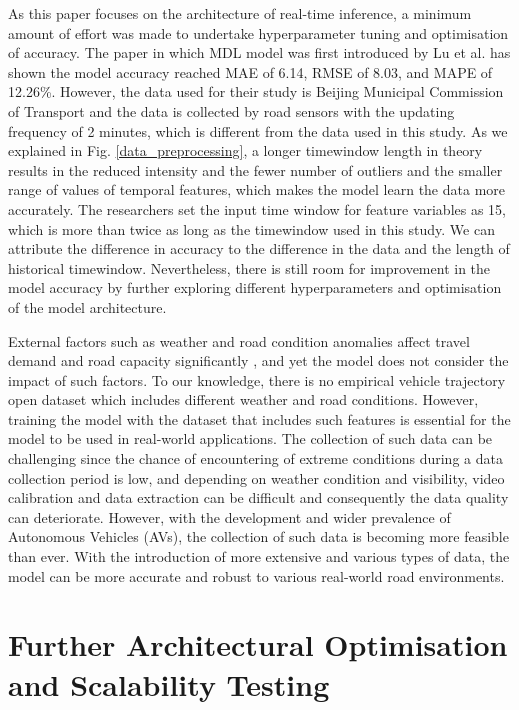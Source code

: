 \documentclass[11pt]{uonthesis}
\begin{document}
As this paper focuses on the architecture of real-time inference, a minimum amount of effort was made to undertake hyperparameter tuning and optimisation of accuracy. The paper in which MDL model was first introduced by Lu et al. \cite{9284587} has shown the model accuracy reached MAE of 6.14, RMSE of 8.03, and MAPE of 12.26\%. However, the data used for their study is Beijing Municipal Commission of Transport and the data is collected by road sensors with the updating frequency of 2 minutes, which is different from the data used in this study. As we explained in Fig. \ref{data_preprocessing}, a longer timewindow length in theory results in the reduced intensity and the fewer number of outliers and the smaller range of values of temporal features, which makes the model learn the data more accurately. The researchers set the input time window for feature variables as 15, which is more than twice as long as the timewindow used in this study. We can attribute the difference in accuracy to the difference in the data and the length of historical timewindow. Nevertheless, there is still room for improvement in the model accuracy by further exploring different hyperparameters and optimisation of the model architecture.

External factors such as weather and road condition anomalies affect travel demand and road capacity significantly \cite{WANG2023107044}, and yet the model does not consider the impact of such factors. To our knowledge, there is no empirical vehicle trajectory open dataset which includes different weather and road conditions. However, training the model with the dataset that includes such features is essential for the model to be used in real-world applications. The collection of such data can be challenging since the chance of encountering of extreme conditions during a data collection period is low, and depending on weather condition and visibility, video calibration and data extraction can be difficult and consequently the data quality can deteriorate. However, with the development and wider prevalence of Autonomous Vehicles (AVs), the collection of such data is becoming more feasible than ever. With the introduction of more extensive and various types of data, the model can be more accurate and robust to various real-world road environments. 

\section{Further Architectural Optimisation and Scalability Testing}
\end{document}

